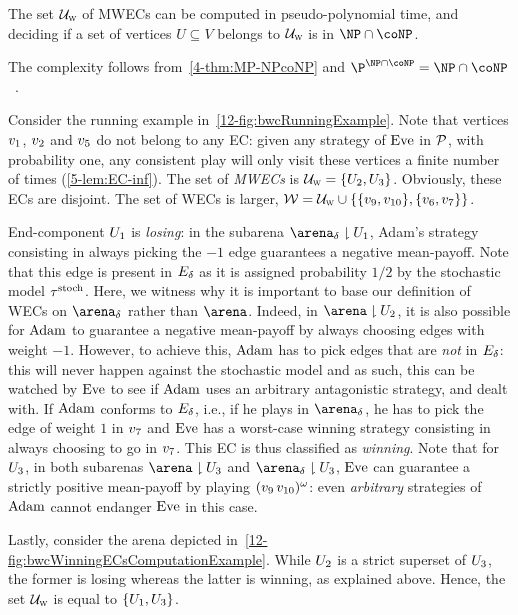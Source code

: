 \begin{lemma}
\label{12-lem:MWEC}
The set $\mathcal{U}_{\textsc{w}}$ of MWECs can be computed in pseudo-polynomial time, and deciding if a set of vertices $U \subseteq V$ belongs to $\mathcal{U}_{\textsc{w}}$ is in $\NP \cap \coNP$.
\end{lemma}

The complexity follows from~\cref{4-thm:MP-NPcoNP} and $\P^{\NP \cap \coNP} = \NP \cap \coNP$~\cite{Brassard:1979}.

\begin{example}
Consider the running example in~\cref{12-fig:bwcRunningExample}. Note that vertices $v_{1}$, $v_{2}$ and $v_{5}$ do not belong to any EC: given any strategy of $\text{Eve}$ in ${\mathcal{P}} $, with probability one, any consistent play will only visit these vertices a finite number of times (\cref{5-lem:EC-inf}). The set of \textit{MWECs} is $\mathcal{U}_{\textsc{w}} = \{U_{2}, U_{3}\}$. Obviously, these ECs are disjoint. The set of WECs is larger, $\mathcal{W} = \mathcal{U}_{\textsc{w}} \cup \{\{v_{9}, v_{10}\}, \{v_{6}, v_{7}\}\}$.

End-component $U_{1}$ is \textit{losing}: in the subarena $\gameNonZero \reduc \ec_{1}$, Adam's strategy consisting in always picking the $-1$ edge guarantees a negative mean-payoff. Note that this edge is present in $E_{\delta}$ as it is assigned probability $1/2$ by the stochastic model $\tau^{\text{stoch}} $. Here, we witness why it is important to base our definition of WECs on $\gameNonZero$ rather than $\arena$. Indeed, in $\arena \reduc \ec_{2}$, it is also possible for $\text{Adam}$ to guarantee a negative mean-payoff by always choosing edges with weight $-1$. However, to achieve this, $\text{Adam}$ has to pick edges that are \textit{not} in $E_{\delta}$: this will never happen against the stochastic model and as such, this can be watched by $\text{Eve}$ to see if $\text{Adam}$ uses an arbitrary antagonistic strategy, and dealt with. If $\text{Adam}$ conforms to $E_{\delta}$, i.e., if he plays in $\gameNonZero$, he has to pick the edge of weight $1$ in $v_{7}$ and $\text{Eve}$ has a worst-case winning strategy consisting in always choosing to go in $v_{7}$. This EC is thus classified as \textit{winning}. Note that for $U_{3}$, in both subarenas $\arena \reduc \ec_{3}$ and $\gameNonZero \reduc \ec_{3}$, $\text{Eve}$ can guarantee a strictly positive mean-payoff by playing $(v_{9}\,v_{10})^\omega$: even \textit{arbitrary} strategies of $\text{Adam}$ cannot endanger $\text{Eve}$ in this case.

Lastly, consider the arena depicted in~\cref{12-fig:bwcWinningECsComputationExample}. While $U_{2}$ is a strict superset of $U_{3}$, the former is losing whereas the latter is winning, as explained above. Hence, the set $\mathcal{U}_{\textsc{w}}$ is equal to $\{U_{1}, U_{3}\}$.
\end{example}

